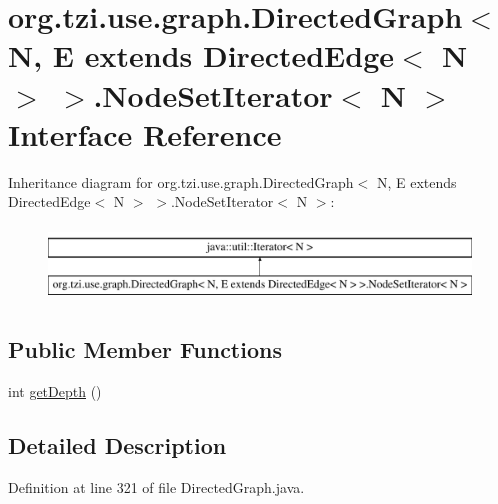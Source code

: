 \hypertarget{interfaceorg_1_1tzi_1_1use_1_1graph_1_1_directed_graph_3_01_n_00_01_e_01extends_01_directed_edgef24c26bac106239dae1087a8e5c4f73c}{\section{org.\-tzi.\-use.\-graph.\-Directed\-Graph$<$ N, E extends Directed\-Edge$<$ N $>$ $>$.Node\-Set\-Iterator$<$ N $>$ Interface Reference}
\label{interfaceorg_1_1tzi_1_1use_1_1graph_1_1_directed_graph_3_01_n_00_01_e_01extends_01_directed_edgef24c26bac106239dae1087a8e5c4f73c}
}
Inheritance diagram for org.\-tzi.\-use.\-graph.\-Directed\-Graph$<$ N, E extends Directed\-Edge$<$ N $>$ $>$.Node\-Set\-Iterator$<$ N $>$\-:\begin{figure}[H]
\begin{center}
\leavevmode
\includegraphics[height=2.000000cm]{interfaceorg_1_1tzi_1_1use_1_1graph_1_1_directed_graph_3_01_n_00_01_e_01extends_01_directed_edgef24c26bac106239dae1087a8e5c4f73c}
\end{center}
\end{figure}
\subsection*{Public Member Functions}
\begin{DoxyCompactItemize}
\item 
int \hyperlink{interfaceorg_1_1tzi_1_1use_1_1graph_1_1_directed_graph_3_01_n_00_01_e_01extends_01_directed_edgef24c26bac106239dae1087a8e5c4f73c_a6dd02c8f5612de15c83371fa6e7d9491}{get\-Depth} ()
\end{DoxyCompactItemize}


\subsection{Detailed Description}


Definition at line 321 of file Directed\-Graph.\-java.



